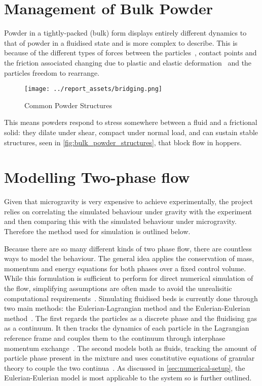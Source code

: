 \section{Management of Bulk Powder}
Powder in a tightly-packed (bulk) form displays entirely different dynamics to that of powder in a fluidised state and is more complex to describe. This is because of the different types of forces between the particles~\cite{ZAFAR2017389}, contact points and the friction associated changing due to plastic and elastic deformation~\cite{TALEBI2024211} and the particles freedom to rearrange. 
\begin{figure}[htbp]
    \centering
    \begin{minipage}{0.5\textwidth}
        \centering
        \texttt{[image: ../report\_assets/bridging.png]}
        \caption{Common Powder Structures~\cite{911Metallurgist_binsflow}}\label{fig:bulk_powder_structures}
    \end{minipage}
\end{figure}
This means powders respond to stress somewhere between a fluid and a frictional solid: they dilate under shear, compact under normal load, and can sustain stable structures, seen in \autoref{fig:bulk_powder_structures}, that block flow in hoppers. 
\newpage
\section{Modelling Two-phase flow}
Given that microgravity is very expensive to achieve experimentally, the project relies on correlating the simulated behaviour under gravity with the experiment and then comparing this with the simulated behaviour under microgravity. Therefore the method used for simulation is outlined below.

Because there are so many different kinds of two phase flow, there are countless ways to model the behaviour.  The general idea applies the conservation of mass, momentum and energy equations for both phases over a fixed control volume. While this formulation is sufficient to perform for direct numerical simulation of the flow, simplifying assumptions are often made to avoid the unrealisitic computational requirements~\cite{enwald1996eulerian}. Simulating fluidised beds is currently done through two main methods: the Eulerian-Lagrangian method and the Eulerian-Eulerian method~\cite{C6RA28615A}. The first regards the particles as a discrete phase and the fluidising gas as a continuum. It then tracks the dynamics of each particle in the Lagrangian reference frame and couples them to the continuum through interphase momentum exchange~\cite{SUBRAMANIAM2013215}. The second models both as fluids, tracking the amount of particle phase present in the mixture and uses constitutive equations of granular theory to couple the two continua~\cite{C6RA28615A}. As discussed in \autoref{sec:numerical-setup}, the Eulerian-Eulerian model is most applicable to the system so is further outlined.


